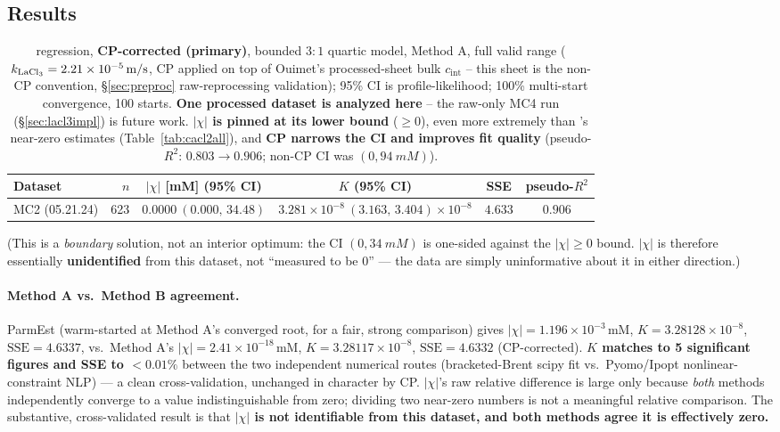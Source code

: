 \documentclass[11pt]{article}
\newcommand{\note}[1]{{\color{blue}\textsf{(#1)}}}
\newcommand{\cint}{c_{\mathrm{int}}}
\newcommand{\SSE}{\mathrm{SSE}}
\begin{document}
\subsection{Results}\label{sec:lacl3results}
\begin{table}[H]
\centering\small
\begin{tabular}{lrcccc}
\toprule
Dataset & $n$ & $|\chi|$ [\si{mM}] (95\% CI) & $K$ (95\% CI) & SSE & pseudo-$R^2$ \\
\midrule
MC2 (05.21.24) & 623 & $0.0000\ (0.000,\,34.48)$ & $3.281\times10^{-8}\ (3.163,\,3.404)\times10^{-8}$ & $4.633$ & $0.906$ \\
\bottomrule
\end{tabular}
\caption{ regression, \textbf{CP-corrected (primary)}, bounded
$3{:}1$ quartic model, Method A, full valid range ($k_{\ce{LaCl3}}=\SI{2.21e-5}{m/s}$,
CP applied on top of Ouimet's processed-sheet bulk $\cint$ -- this sheet is the non-CP
convention, \S\ref{sec:preproc} raw-reprocessing validation); 95\% CI is
profile-likelihood; 100\% multi-start convergence, 100 starts. \textbf{One
processed  dataset is analyzed here} --
the raw-only MC4 run (\S\ref{sec:lacl3impl}) is future work. \textbf{$|\chi|$
is pinned at its lower bound} ($\ge0$), even more extremely than
's near-zero estimates (Table~\ref{tab:cacl2all}), and \textbf{CP
narrows the CI and improves fit quality} (pseudo-$R^2$: $0.803\to0.906$;
non-CP CI was $(0,\SI{94}{mM})$).}
\label{tab:lacl3}
\end{table}
\note{This is a \emph{boundary} solution, not an interior optimum: the CI
$(0,\SI{34}{mM})$ is one-sided against the $|\chi|\ge0$ bound. $|\chi|$ is
therefore essentially \textbf{unidentified} from this dataset, not
``measured to be $0$'' --- the data are simply uninformative about it in
either direction.}

\paragraph{Method A vs.\ Method B agreement.} ParmEst (warm-started at
Method A's converged root, for a fair, strong comparison) gives
$|\chi|=1.196\times10^{-3}$\,mM, $K=3.28128\times10^{-8}$, $\SSE=4.6337$, vs.\
Method A's $|\chi|=2.41\times10^{-18}$\,mM, $K=3.28117\times10^{-8}$,
$\SSE=4.6332$ (CP-corrected). \textbf{$K$ matches to 5 significant figures and SSE to
$<0.01\%$} between the two independent numerical routes (bracketed-Brent
scipy fit vs.\ Pyomo/Ipopt nonlinear-constraint NLP) --- a clean
cross-validation, unchanged in character by CP. $|\chi|$'s raw relative difference is large only because
\emph{both} methods independently converge to a value indistinguishable
from zero; dividing two near-zero numbers is not a meaningful relative
comparison. The substantive, cross-validated result is that \textbf{$|\chi|$
is not identifiable from this dataset, and both methods agree it is
effectively zero.}
\end{document}
